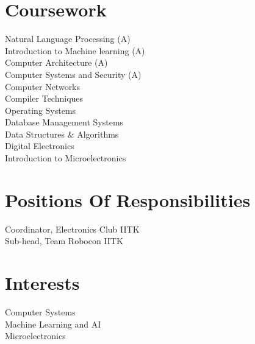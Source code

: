 \documentclass[]{deedy-resume-openfont}
\begin{document}
\begin{minipage}[t]{0.30\textwidth}
\section{Coursework}
\textbullet{} Natural Language Processing (A)\\
\textbullet{} Introduction to  Machine learning (A)\\
\textbullet{} Computer Architecture (A)\\
\textbullet{} Computer Systems and Security (A)\\
\textbullet{} Computer Networks\\
\textbullet{} Compiler Techniques \\
\textbullet{} Operating Systems \\
\textbullet{} Database Management Systems \\
\textbullet{} Data Structures \& Algorithms \\
\textbullet{} Digital Electronics\\
\textbullet{} Introduction to Microelectronics\\
\sectionsep

\section{Positions Of Responsibilities}
\textbullet{} Coordinator, Electronics Club IITK\\
\hspace{1.5cm}
\textbullet{} Sub-head, Team Robocon IITK\\
\hspace{1.5cm}
\sectionsep


\section{Interests}
\textbullet{} Computer Systems\\
\textbullet{} Machine Learning and AI\\
\textbullet{} Microelectronics
\sectionsep



\end{minipage} 
\hfill
\end{document}

